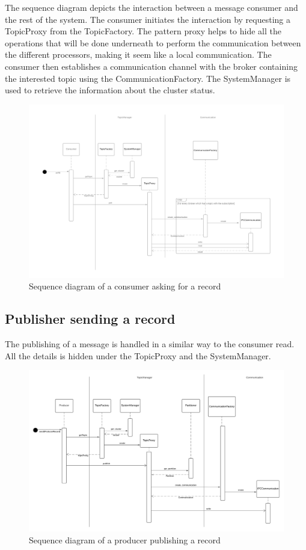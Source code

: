 The sequence diagram depicts the interaction between a message consumer and
the rest of the system. The consumer initiates the interaction by requesting
a TopicProxy from the TopicFactory.
The pattern proxy helps to hide all the operations that will be done underneath
to perform the communication between the different processors, making it seem
like a local communication.
The consumer then establishes a communication channel with the broker
containing the interested topic using the CommunicationFactory.
The SystemManager is used to retrieve the information about the cluster status.

\begin{figure}[H]
    \centering
    \includegraphics[width=1.0\textwidth]{Figures/sequence_diagram_consumer_poll.png}
    \caption{Sequence diagram of a consumer asking for a record}
\end{figure}

\subsection{Publisher sending a record}

The publishing of a message is handled in a similar way to the consumer read.
All the details is hidden under the TopicProxy and the SystemManager.

\begin{figure}[ht]
    \centering
    \includegraphics[width=1.0\textwidth]{Figures/sequence_diagram_producer.png}
    \caption{Sequence diagram of a producer publishing a record}
\end{figure}

